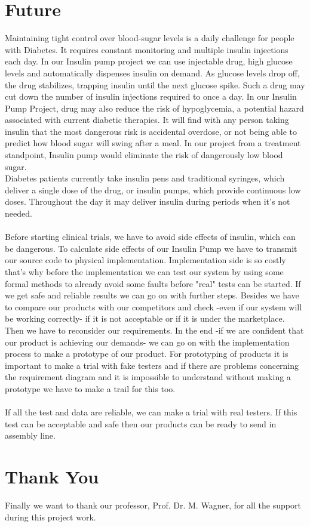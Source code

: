 \documentclass[pdflatex,a4paper,11pt,english]{scrreprt}
\begin{document}
\section{Future}
Maintaining tight control over blood-sugar levels is a daily challenge for people with Diabetes. It requires constant monitoring and multiple insulin injections each day. In our Insulin pump project we can use injectable drug, high glucose levels and automatically dispenses insulin on demand. As glucose levels drop off, the drug stabilizes, trapping insulin until the next glucose spike. Such a drug may cut down the number of insulin injections required to once a day.
In our Insulin Pump Project, drug may also reduce the risk of hypoglycemia, a potential hazard associated with current diabetic therapies. It will find with any person taking insulin that the most dangerous risk is accidental overdose, or not being able to predict how blood sugar will swing after a meal. In our project from a treatment standpoint, Insulin pump would eliminate the risk of dangerously low blood sugar.
\\ 
Diabetes patients currently take insulin pens and traditional syringes, which deliver a single dose of the drug, or insulin pumps, which provide continuous low doses. Throughout the day it may deliver insulin during periods when it's not needed.
\\ \\ 
Before starting clinical trials, we have to avoid side effects of insulin, which can be dangerous. To calculate side effects of our Insulin Pump we have to transmit our source code to physical implementation. Implementation side is so costly that's why before the implementation we can test our system by using some formal methods to already avoid some faults before "real" tests can be started. If  we get safe and reliable results we can go on with further steps. Besides we have to compare our products with our competitors and check -even if our system will be working correctly- if it is not acceptable or if it is under the marketplace. Then we have to reconsider our requirements. In the end -if we are confident that our product is achieving our demands- we can go on with the implementation process to make a prototype of our product. For prototyping of products it is important to make a trial with fake testers and if there are problems concerning the requirement diagram and it is impossible to understand without making a prototype we have to make a trail for this too.
\\ \\
If all the test and data are reliable, we can make a trial with real testers. If this test can be acceptable and safe then our products can be ready to send in assembly line.    

\section{Thank You}
Finally we want to thank our professor, Prof. Dr. M. Wagner, for all the support during this project work.



        
\end{document}
